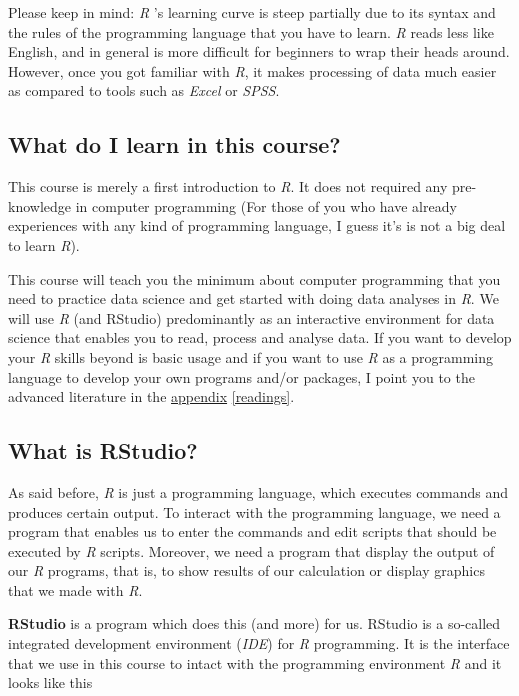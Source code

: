 \documentclass[
]{scrartcl}
\begin{document}
Please keep in mind: \emph{R} 's learning curve is steep partially due to its syntax and the rules of the programming language that you have to learn. \emph{R} reads less like English, and in general is more difficult for beginners to wrap their heads around. However, once you got familiar with \emph{R}, it makes processing of data much easier as compared to tools such as \emph{Excel} or \emph{SPSS}.

\subsection{What do I learn in this course?}\label{what-do-i-learn-in-this-course}

This course is merely a first introduction to \emph{R}. It does not required any pre-knowledge in computer programming (For those of you who have already experiences with any kind of programming language, I guess it's is not a big deal to learn \emph{R}).

This course will teach you the minimum about computer programming that you need to practice data science and get started with doing data analyses in \emph{R}. We will use \emph{R} (and RStudio) predominantly as an interactive environment for data science that enables you to read, process and analyse data. If you want to develop your \emph{R} skills beyond is basic usage and if you want to use \emph{R} as a programming language to develop your own programs and/or packages, I point you to the advanced literature in the \hyperref[readings]{appendix} \ref{readings}.

\subsection{What is RStudio?}\label{what-is-rstudio}

As said before, \emph{R} is just a programming language, which executes commands and produces certain output. To interact with the programming language, we need a program that enables us to enter the commands and edit scripts that should be executed by \emph{R} scripts. Moreover, we need a program that display the output of our \emph{R} programs, that is, to show results of our calculation or display graphics that we made with \emph{R}.

\textbf{RStudio} is a program which does this (and more) for us. RStudio is a so-called integrated development environment (\emph{IDE}) for \emph{R} programming. It is the interface that we use in this course to intact with the programming environment \emph{R} and it looks like this
\end{document}
